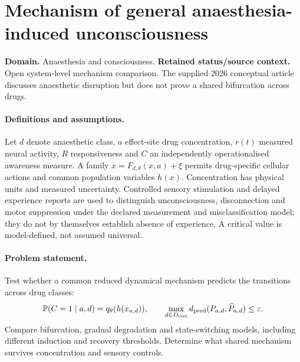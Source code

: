 \documentclass[11pt]{article}
\begin{document}
\section*{Mechanism of general anaesthesia-induced unconsciousness}
\label{prob:116}
\label{rank:81}
\par\smallskip

\noindent\textbf{Domain.} Anaesthesia and consciousness. \quad \textbf{Retained status/source context.} Open system-level mechanism comparison. The supplied 2026 conceptual article discusses anaesthetic disruption but does not prove a shared bifurcation across drugs.
\paragraph{Definitions and assumptions.} Let $d$ denote anaesthetic class, $a$ effect-site drug concentration, $r(t)$ measured neural activity, $R$ responsiveness and $C$ an independently operationalised awareness measure. A family $\dot x=F_{d,\theta}(x,a)+\xi$ permits drug-specific cellular actions and common population variables $h(x)$. Concentration has physical units and measured uncertainty. Controlled sensory stimulation and delayed experience reports are used to distinguish unconsciousness, disconnection and motor suppression under the declared measurement and misclassification model; they do not by themselves establish absence of experience. A critical value is model-defined, not assumed universal.
\paragraph{Problem statement.} Test whether a common reduced dynamical mechanism predicts the transitions across drug classes:
\[
\mathbb{P}(C=1\mid a,d)=q_\theta(h(x_{a,d})),
\qquad
\max_{d\in D_{\rm test}}d_{\rm pred}(P_{a,d},\widehat P_{a,d})\leq\varepsilon.
\]
Compare bifurcation, gradual degradation and state-switching models, including different induction and recovery thresholds. Determine what shared mechanism survives concentration and sensory controls.
\end{document}
